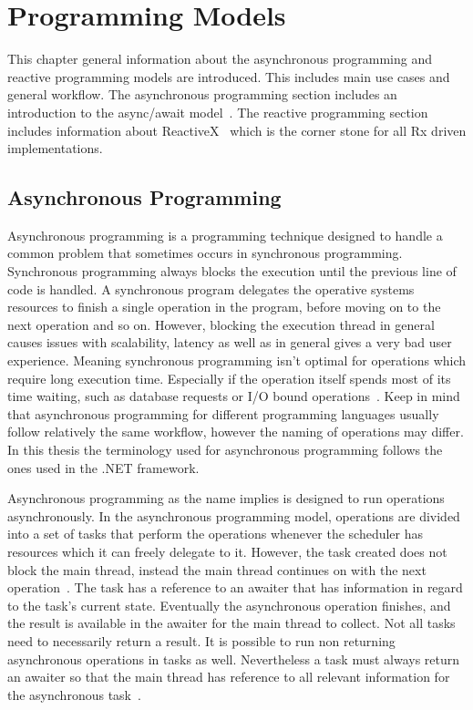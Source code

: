 \chapter{Programming Models}
\label{chapter:ProgrammingModels}
\iffalse
This chapter general information about the asynchronous programming and reactive programming models are introduced. This includes main use cases and general workflow. The asynchronous programming section includes an introduction to the async/await model~\cite{DOC:AsyncAwait}. The reactive programming section includes information about ReactiveX~\cite{WEB:ReactiveXMainPage} which is the corner stone for all Rx driven implementations.
\section{Asynchronous Programming}
\label{section:AsyncProgramming}
Asynchronous programming is a programming technique designed to handle a common problem that sometimes occurs in synchronous programming. Synchronous programming always blocks the execution until the previous line of code is handled. A synchronous program delegates the operative systems resources to finish a single operation in the program, before moving on to the next operation and so on. However, blocking the execution thread in general causes issues with scalability, latency as well as in general gives a very bad user experience. Meaning synchronous programming isn't optimal for operations which require long execution time. Especially if the operation itself spends most of its time waiting, such as database requests or I/O bound operations~\cite{VIDEO:AsyncConBack, WEB:AsyncAwaitTut}. Keep in mind that asynchronous programming for different programming languages usually follow relatively the same workflow, however the naming of operations may differ. In this thesis the terminology used for asynchronous programming follows the ones used in the .NET framework.

Asynchronous programming as the name implies is designed to run operations asynchronously. In the asynchronous programming model, operations are divided into a set of tasks that perform the operations whenever the scheduler has resources which it can freely delegate to it.
However, the task created does not block the main thread, instead the main thread continues on with the next operation~\cite{WEB:AsyncAwaitTut, VIDEO:AsyncConBack, DOC:AsyncAwait}.
The task has a reference to an awaiter that has information in regard to the task's current state. Eventually the asynchronous operation finishes, and the result is available in the awaiter for the main thread to collect. Not all tasks need to necessarily return a result. It is possible to run non returning asynchronous operations in tasks as well. Nevertheless a task must always return an awaiter so that the main thread has reference to all relevant information for the asynchronous task~\cite{WEB:AsyncAwaitTut}.

